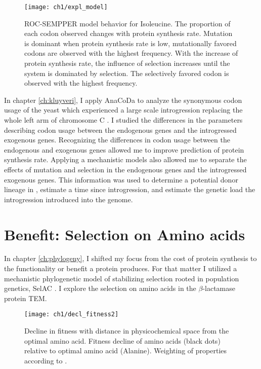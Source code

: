 \begin{figure}[H]
     \centering
	\texttt{[image: ch1/expl\_model]}
	\caption{ROC-SEMPPER model behavior for Isoleucine.
	The proportion of each codon observed changes with protein synthesis rate.
	Mutation is dominant when protein synthesis rate is low, mutationally favored codons are observed with the highest frequency.
	With the increase of protein synthesis rate, the influence of selection increases until the system is dominated by selection.
	The selectively favored codon is observed with the highest frequency.}
	\label{fig:expl_model}
\end{figure}

In chapter \ref{ch:kluyveri}, I apply AnaCoDa to analyze the synonymous codon usage of the yeast \kluyveri which experienced a large scale introgression replacing the whole left arm of chromosome C \citep{friedrich2015}.
I studied the differences in the parameters describing codon usage between the endogenous \kluyveri genes and the introgressed exogenous genes.
Recognizing the differences in codon usage between the endogenous and exogenous genes allowed me to improve prediction of protein synthesis rate.
Applying a mechanistic models also allowed me to separate the effects of mutation and selection in the endogenous \kluyveri genes and the introgressed exogenous genes.
This information was used to determine a potential donor lineage in \gossypii, estimate a time since introgression, and estimate the genetic load the introgression introduced into the \kluyveri genome.

\section{Benefit: Selection on Amino acids}

In chapter \ref{ch:phylogeny}, I shifted my focus from the cost of protein synthesis to the functionality or benefit a protein produces.
For that matter I utilized a mechanistic phylogenetic model of stabilizing selection rooted in population genetics, SelAC \cite{beaulieu2018}.
I explore the selection on amino acids in the $\beta$-lactamase protein TEM.
 
\begin{figure}[H]
     \centering
	\texttt{[image: ch1/decl\_fitness2]}
	\caption{Decline in fitness with distance in physicochemical space from the optimal amino acid. 
	Fitness decline of amino acids (black dots) relative to optimal amino acid (Alanine). Weighting of properties according to \citet{grantham1974}.}
	\label{fig:decl_fit}
\end{figure}

